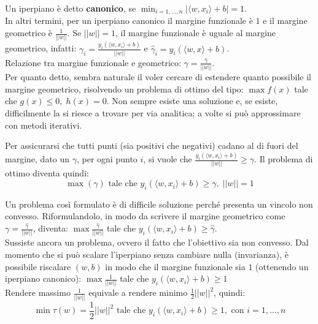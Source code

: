 \bigskip

Un iperpiano è detto \textbf{canonico}, se $\displaystyle \min_{i = 1, \dots, n}|\langle w,x_i \rangle+ b| = 1$. \\
In altri termini, per un iperpiano canonico il margine funzionale è $1$ e il margine geometrico è $\displaystyle \frac{1}{||w||}$. 
Se $||w|| = 1$, il margine funzionale è uguale al margine geometrico, infatti: $\gamma_i = \displaystyle \frac{y_i(\langle w, x_i \rangle + b)}{||w||}$ e $\hat \gamma_i = y_i (\langle w,x \rangle + b)$.\\

Relazione tra margine funzionale e geometrico: $\gamma = \displaystyle \frac{\hat \gamma}{||w||}$.\\
Per quanto detto, sembra naturale il voler cercare di estendere quanto possibile il margine geometrico, risolvendo un problema di ottimo del tipo:  $\max f(x)$ tale che $g(x) \leq 0, \;  h(x)=0$. Non sempre esiste una soluzione e, se esiste, difficilmente la si riesce a trovare per via analitica; a volte si può approssimare con metodi iterativi.

Per assicurarsi che tutti punti (sia positivi che negativi) cadano al di fuori del margine, dato un $\gamma$, per ogni punto $i$, si vuole che $\displaystyle \frac{y_i(\langle w, x_i \rangle + b)}{||w||} \geq \gamma$. Il problema di ottimo diventa quindi: 
$$\max (\gamma) \mbox{ tale che } y_i(\langle w, x_i \rangle + b) \geq \gamma, \;  ||w||=1$$ 

Un problema così formulato è di difficile soluzione perché presenta un vincolo non convesso. Riformulandolo, in modo da scrivere il margine geometrico come $\gamma = \displaystyle \frac{\hat \gamma}{||w||}$, diventa:  $\max \displaystyle \frac{\hat\gamma}{||w||}$ tale che $y_i(\langle w, x_i \rangle + b) \geq \hat \gamma$. \\
Sussiste ancora un problema, ovvero il fatto che l’obiettivo sia non convesso. Dal momento che si può scalare l’iperpiano senza cambiare nulla (invarianza), è possibile riscalare $(w,b)$ in modo che il margine funzionale sia $1$ (ottenendo un iperpiano canonico): $\max \displaystyle \frac{1}{||w||}$ tale che $y_i(\langle w, x_i \rangle + b) \geq 1$\\ 

Rendere massimo $\displaystyle \frac{1}{||w||}$ equivale a rendere minimo $\displaystyle \frac{1}{2}||w||^2$, quindi: 
$$\min \tau(w) = \displaystyle \frac{1}{2}||w||^2 \mbox{ tale che } y_i(\langle w, x_i \rangle + b) \geq 1, \mbox{ con } i = 1, \dots, n$$

